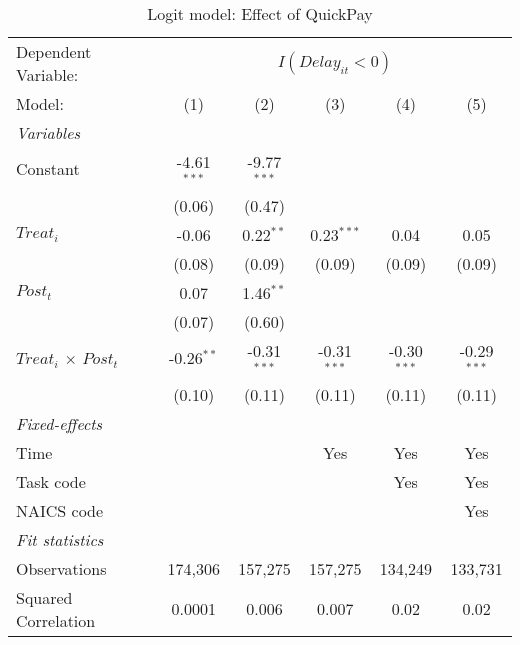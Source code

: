 \documentclass[
]{article}
\begin{document}
\begin{table}[htbp]
   \caption{Logit model: Effect of QuickPay}
   \centering
   \begin{tabular}{lccccc}
      \tabularnewline \midrule \midrule
      Dependent Variable: & \multicolumn{5}{c}{$I(Delay_{it}<0)$}\\
      Model:                       & (1)           & (2)           & (3)           & (4)           & (5)\\  
      \midrule
      \emph{Variables}\\
      Constant                     & -4.61$^{***}$ & -9.77$^{***}$ &               &               &   \\   
                                   & (0.06)        & (0.47)        &               &               &   \\   
      $Treat_i$                    & -0.06         & 0.22$^{**}$   & 0.23$^{***}$  & 0.04          & 0.05\\   
                                   & (0.08)        & (0.09)        & (0.09)        & (0.09)        & (0.09)\\   
      $Post_t$                     & 0.07          & 1.46$^{**}$   &               &               &   \\   
                                   & (0.07)        & (0.60)        &               &               &   \\   
      $Treat_i$ $\times$ $Post_t$  & -0.26$^{**}$  & -0.31$^{***}$ & -0.31$^{***}$ & -0.30$^{***}$ & -0.29$^{***}$\\   
                                   & (0.10)        & (0.11)        & (0.11)        & (0.11)        & (0.11)\\   
      \midrule
      \emph{Fixed-effects}\\
      Time                         &               &               & Yes           & Yes           & Yes\\  
      Task code                    &               &               &               & Yes           & Yes\\  
      NAICS code                   &               &               &               &               & Yes\\  
      \midrule
      \emph{Fit statistics}\\
      Observations                 & 174,306       & 157,275       & 157,275       & 134,249       & 133,731\\  
      Squared Correlation          & 0.0001        & 0.006         & 0.007         & 0.02          & 0.02\\  

\end{tabular}
\end{table}
\end{document}
